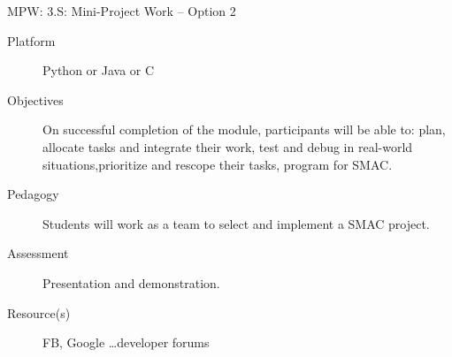\documentclass[12pt]{beamer}
\begin{document}
{\begin{frame}{MPW: 3.S: Mini-Project Work -- Option 2}
  \begin{description}
  \item[Platform] Python or Java or C 
  \item[Objectives] On successful completion of the module, participants will be able to: plan, allocate tasks and integrate their work, test and debug in real-world situations,prioritize and rescope their tasks, program for SMAC.
  \item[Pedagogy] Students will work as a team to select and implement a SMAC project.
  \item[Assessment] Presentation and demonstration.
  \item[Resource(s)] FB, Google \ldots developer forums
  \end{description}
\end{frame}

}
\end{document}
